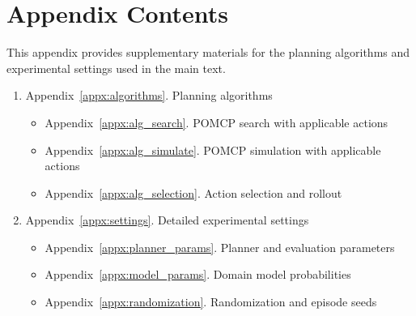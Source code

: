 \onecolumn
\setcounter{secnumdepth}{3}
\section*{Appendix Contents}
This appendix provides supplementary materials for the planning algorithms and experimental settings used in the main text.

\begin{enumerate}
  \item Appendix~\ref{appx:algorithms}. Planning algorithms
  \begin{itemize}
    \item Appendix~\ref{appx:alg_search}. POMCP search with applicable actions
    \item Appendix~\ref{appx:alg_simulate}. POMCP simulation with applicable actions
    \item Appendix~\ref{appx:alg_selection}. Action selection and rollout
  \end{itemize}

  \item Appendix~\ref{appx:settings}. Detailed experimental settings
  \begin{itemize}
    \item Appendix~\ref{appx:planner_params}. Planner and evaluation parameters
    \item Appendix~\ref{appx:model_params}. Domain model probabilities
    \item Appendix~\ref{appx:randomization}. Randomization and episode seeds
  \end{itemize}

\end{enumerate}
